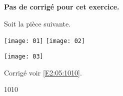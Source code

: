 \normaltrue \difficilefalse \tdifficilefalse
\correctionfalse


\setcounter{question}{0}

\ifcorrection
\else
\textbf{Pas de corrigé pour cet exercice.}
\fi

\ifprof 
\else
Soit la pièce suivante.
\begin{center}
\texttt{[image: 01]}
\texttt{[image: 02]}
\end{center}
 \fi
 
\ifprof
\else 
\begin{center}
\texttt{[image: 03]}
\end{center}
\fi

\ifprof
\else
\begin{flushright}
\footnotesize{Corrigé  voir \ref{E2:05:1010}.}
\end{flushright}1010
\fi